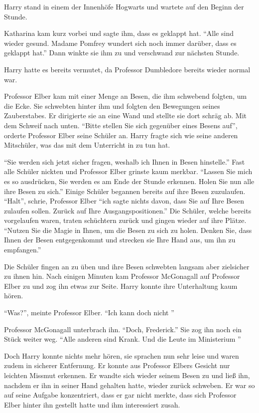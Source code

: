 \trenn

Harry stand in einem der Innenhöfe Hogwarts und wartete auf den Beginn der Stunde.

Katharina kam kurz vorbei und sagte ihm, dass es geklappt hat. \enquote{Alle sind wieder gesund. Madame Pomfrey wundert sich noch immer darüber, dass es geklappt hat.} Dann winkte sie ihm zu und verschwand zur nächsten Stunde.

Harry hatte es bereits vermutet, da Professor Dumbledore bereits wieder normal war.

Professor Elber kam mit einer Menge an Besen, die ihm schwebend folgten, um die Ecke. Sie schwebten hinter ihm und folgten den Bewegungen seines Zauberstabes. Er dirigierte sie an eine Wand und stellte sie dort schräg ab. Mit dem Schweif nach unten. \enquote{Bitte stellen Sie sich gegenüber eines Besens auf}, orderte Professor Elber seine Schüler an. Harry fragte sich wie seine anderen Mitschüler, was das mit dem Unterricht in \VgddK zu tun hat.

\enquote{Sie werden sich jetzt sicher fragen, weshalb ich Ihnen in \VgddK Besen hinstelle.} Fast alle Schüler nickten und Professor Elber grinste kaum merkbar. \enquote{Lassen Sie mich es so ausdrücken, Sie werden es am Ende der Stunde erkennen. Holen Sie nun alle ihre Besen zu sich.} Einige Schüler begannen bereits auf ihre Besen zuzulaufen. \enquote{Halt}, schrie, Professor Elber \enquote{ich sagte nichts davon, dass Sie auf Ihre Besen zulaufen sollen. Zurück auf Ihre Ausgangspositionen.} Die Schüler, welche bereits vorgelaufen waren, traten schüchtern zurück und gingen wieder auf ihre Plätze. \enquote{Nutzen Sie die Magie in Ihnen, um die Besen zu sich zu holen. Denken Sie, dass Ihnen der Besen entgegenkommt und strecken sie Ihre Hand aus, um ihn zu empfangen.}

Die Schüler fingen an zu üben und ihre Besen schwebten langsam aber zielsicher zu ihnen hin. Nach einigen Minuten kam Professor McGonagall auf Professor Elber zu und zog ihn etwas zur Seite. Harry konnte ihre Unterhaltung kaum hören.

\enquote{Was?}, meinte Professor Elber. \enquote{Ich kann doch nicht \gst}

Professor McGonagall unterbrach ihn. \enquote{Doch, Frederick.} Sie zog ihn noch ein Stück weiter weg. \enquote{Alle anderen sind Krank. Und die Leute im Ministerium \gst}

Doch Harry konnte nichts mehr hören, sie sprachen nun sehr leise und waren zudem in sicherer Entfernung. Er konnte aus Professor Elbers Gesicht nur leichten Missmut erkennen. Er wandte sich wieder seinem Besen zu und ließ ihn, nachdem er ihn in seiner Hand gehalten hatte, wieder zurück schweben. Er war so auf seine Aufgabe konzentriert, dass er gar nicht merkte, dass sich Professor Elber hinter ihn gestellt hatte und ihm interessiert zusah.

